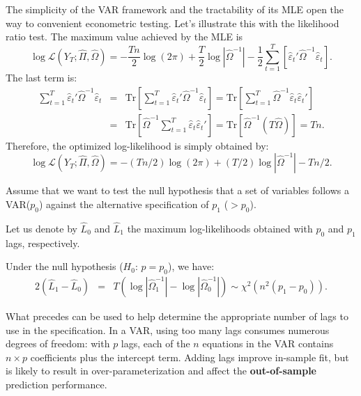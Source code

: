 \documentclass[
  12pt,
]{book}
\theoremstyle{definition}
\theoremstyle{definition}
\theoremstyle{definition}
\theoremstyle{definition}
\theoremstyle{remark}
\begin{document}
The simplicity of the VAR framework and the tractability of its MLE open the way to convenient econometric testing. Let's illustrate this with the likelihood ratio test. The maximum value achieved by the MLE is
\[
\log\mathcal{L}(Y_{T};\hat{\Pi},\hat{\Omega}) = -\frac{Tn}{2}\log(2\pi)+\frac{T}{2}\log\left|\hat{\Omega}^{-1}\right| -\frac{1}{2}\sum_{t=1}^{T}\left[\hat{\varepsilon}_{t}'\hat{\Omega}^{-1}\hat{\varepsilon}_{t}\right].
\]
The last term is:
\begin{eqnarray*}
\sum_{t=1}^{T}\hat{\varepsilon}_{t}'\hat{\Omega}^{-1}\hat{\varepsilon}_{t} &=& \mbox{Tr}\left[\sum_{t=1}^{T}\hat{\varepsilon}_{t}'\hat{\Omega}^{-1}\hat{\varepsilon}_{t}\right] = \mbox{Tr}\left[\sum_{t=1}^{T}\hat{\Omega}^{-1}\hat{\varepsilon}_{t}\hat{\varepsilon}_{t}'\right]\\
&=&\mbox{Tr}\left[\hat{\Omega}^{-1}\sum_{t=1}^{T}\hat{\varepsilon}_{t}\hat{\varepsilon}_{t}'\right] = \mbox{Tr}\left[\hat{\Omega}^{-1}\left(T\hat{\Omega}\right)\right]=Tn.
\end{eqnarray*}
Therefore, the optimized log-likelihood is simply obtained by:
\begin{equation}
\log\mathcal{L}(Y_{T};\hat{\Pi},\hat{\Omega})=-(Tn/2)\log(2\pi)+(T/2)\log\left|\hat{\Omega}^{-1}\right|-Tn/2.\label{eq:optimzedLogL}
\end{equation}

Assume that we want to test the null hypothesis that a set of variables follows a VAR(\(p_{0}\)) against the alternative
specification of \(p_{1}\) (\(>p_{0}\)).

Let us denote by \(\hat{L}_{0}\) and \(\hat{L}_{1}\) the maximum log-likelihoods obtained with \(p_{0}\) and \(p_{1}\) lags, respectively.

Under the null hypothesis (\(H_0\): \(p=p_0\)), we have:
\begin{eqnarray*}
2\left(\hat{L}_{1}-\hat{L}_{0}\right)&=&T\left(\log\left|\hat{\Omega}_{1}^{-1}\right|-\log\left|\hat{\Omega}_{0}^{-1}\right|\right)  \sim \chi^2(n^{2}(p_{1}-p_{0})).
\end{eqnarray*}

What precedes can be used to help determine the appropriate number of lags to use in the specification. In a VAR, using too many lags consumes numerous degrees of freedom: with \(p\) lags, each of the \(n\) equations in the VAR contains \(n\times p\) coefficients plus the intercept term. Adding lags improve in-sample fit, but is likely to result in over-parameterization and affect the \textbf{out-of-sample} prediction performance.
\end{document}
